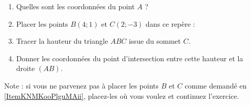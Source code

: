 
\begin{exercice}\label{exo2smath-0084}

\begin{center}
   
\end{center}

\begin{enumerate}
    \item
        Quelles sont les coordonnées du point \( A\) ?
    \item       \label{ItemKNMKooPlguMAii}
        Placer les points \( B(4;1)\) et \( C(2;-3)\) dans ce repère :
    \item
        Tracer la hauteur du triangle \( ABC\) issue du sommet \( C \).
    \item
        Donner les coordonnées du point d'intersection entre cette hauteur et la droite \( (AB)\).
\end{enumerate}
Note : si vous ne parvenez pas à placer les points \( B\) et \( C\) comme demandé en \ref{ItemKNMKooPlguMAii}, placez-les où vous voulez et continuez l'exercice.

\end{exercice}

